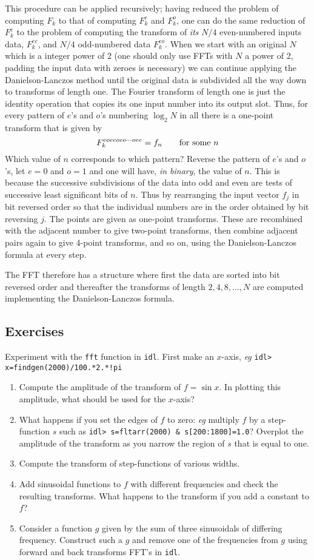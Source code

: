 \documentclass{article}
\begin{document}
This procedure can be applied recursively; having reduced the problem of
computing $F_k$ to that of computing $F_k^e$ and $F_k^o$, one can do the 
same reduction of $F_k^e$ to the problem of computing the transform of 
{\it its} $N/4$ even-numbered inputs data, $F_k^{ee}$, and $N/4$ odd-numbered 
data $F_k^{eo}$. When we start with an original $N$ which is a integer 
power of 2 (one should only use FFTs with $N$ a power of 2, padding the input
data with zeroes is necessary) we can continue applying the Danielson-Lanczos 
method until the original data is subdivided all the way down to transforms
of length one. The Fourier transform of length one is just the identity 
operation that copies its one input number into its output slot. Thus, 
for every pattern of $e$'s and $o$'s numbering $\log_2 N$ in all there is a 
one-point transform that is given by 
\[
F_k^{eoeeoeo\cdots oee}=f_n\qquad {\rm for~some~}n
\]
Which value of $n$ corresponds to which pattern? Reverse the pattern of 
$e$'s and $o$'s, let $e=0$ and $o=1$ and one will have, {\it in binary}, the
value of $n$. This is because the successive subdivisions of the data into 
odd and even are tests of successive least significant bits of $n$. Thus
by rearranging the input vector $f_j$ in bit reversed order so that the 
individual numbers are in the order obtained by bit reversing $j$. The points
are given as one-point transforms. These are recombined with the adjacent 
number to give two-point transforms, then combine adjacent pairs again to 
give 4-point transforms, and so on, using the Danielson-Lanczos formula
at every step.

The FFT therefore has a structure where first the data are sorted into
bit reversed order and thereafter the transforms of length $2,4,8,\ldots,N$
are computed implementing the Danielson-Lanczos formula.

\subsection*{Exercises}

Experiment with the {\tt fft} function in {\tt idl}. First make an $x$-axis, 
{\it eg} {\tt idl> x=findgen(2000)/100.*2.*!pi}
\begin{enumerate}
\item Compute the amplitude of the transform of $f=\sin x$. In plotting this 
amplitude, what should be used for the $x$-axis?
\item What happens if you set the edges of $f$ to zero: {\it eg} multiply $f$
by a step-function $s$ such as {\tt idl> s=fltarr(2000) \& s[200:1800]=1.0}? 
Overplot the amplitude of the transform as you narrow the region of $s$ that is
equal to one.
\item Compute the transform of step-functions of various widths.
\item Add sinusoidal functions to $f$ with different frequencies and check the
resulting transforms. What happens to the transform if you add a constant to 
$f$? 
\item Consider a function $g$ given by the sum of three sinusoidals of differing
frequency. Construct such a $g$ and remove one of the frequencies from $g$ using 
forward and back transforms FFT's in {\tt idl}.
\end{enumerate}
\end{document}
